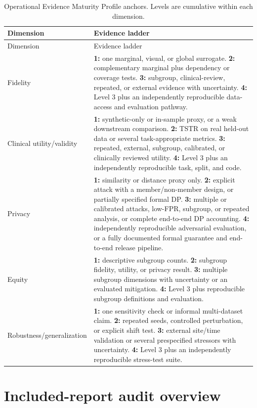 \documentclass[11pt,letterpaper]{article}
\begin{document}
\begin{longtable}{P{2.7cm}P{12.6cm}}
\caption{Operational Evidence Maturity Profile anchors. Levels are cumulative within each dimension.}\label{tab:maturity}\\
\toprule
Dimension & Evidence ladder \\
\midrule
\endfirsthead
\toprule
Dimension & Evidence ladder \\
\midrule
\endhead
Fidelity & \textbf{1:} one marginal, visual, or global surrogate. \textbf{2:} complementary marginal plus dependency or coverage tests. \textbf{3:} subgroup, clinical-review, repeated, or external evidence with uncertainty. \textbf{4:} Level 3 plus an independently reproducible data-access and evaluation pathway. \\
Clinical utility/validity & \textbf{1:} synthetic-only or in-sample proxy, or a weak downstream comparison. \textbf{2:} TSTR on real held-out data or several task-appropriate metrics. \textbf{3:} repeated, external, subgroup, calibrated, or clinically reviewed utility. \textbf{4:} Level 3 plus an independently reproducible task, split, and code. \\
Privacy & \textbf{1:} similarity or distance proxy only. \textbf{2:} explicit attack with a member/non-member design, or partially specified formal DP. \textbf{3:} multiple or calibrated attacks, low-FPR, subgroup, or repeated analysis, or complete end-to-end DP accounting. \textbf{4:} independently reproducible adversarial evaluation, or a fully documented formal guarantee and end-to-end release pipeline. \\
Equity & \textbf{1:} descriptive subgroup counts. \textbf{2:} subgroup fidelity, utility, or privacy result. \textbf{3:} multiple subgroup dimensions with uncertainty or an evaluated mitigation. \textbf{4:} Level 3 plus reproducible subgroup definitions and evaluation. \\
Robustness/\allowbreak generalization & \textbf{1:} one sensitivity check or informal multi-dataset claim. \textbf{2:} repeated seeds, controlled perturbation, or explicit shift test. \textbf{3:} external site/time validation or several prespecified stressors with uncertainty. \textbf{4:} Level 3 plus an independently reproducible stress-test suite. \\
\bottomrule
\end{longtable}

\clearpage
\section{Included-report audit overview}
\end{document}
